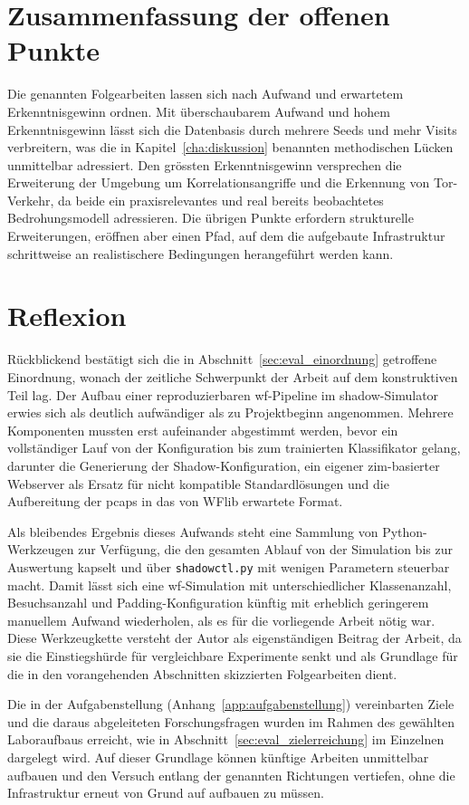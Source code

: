 \section{Zusammenfassung der offenen Punkte}
\label{sec:ausblick_summary}

Die genannten Folgearbeiten lassen sich nach Aufwand und erwartetem Erkenntnisgewinn ordnen.
Mit überschaubarem Aufwand und hohem Erkenntnisgewinn lässt sich die Datenbasis durch mehrere Seeds und mehr Visits verbreitern, was die in Kapitel~\ref{cha:diskussion} benannten methodischen Lücken unmittelbar adressiert.
Den grössten Erkenntnisgewinn versprechen die Erweiterung der Umgebung um Korrelationsangriffe und die Erkennung von Tor-Verkehr, da beide ein praxisrelevantes und real bereits beobachtetes Bedrohungsmodell adressieren.
Die übrigen Punkte erfordern strukturelle Erweiterungen, eröffnen aber einen Pfad, auf dem die aufgebaute Infrastruktur schrittweise an realistischere Bedingungen herangeführt werden kann.

\section{Reflexion}
\label{sec:ausblick_reflexion}

Rückblickend bestätigt sich die in Abschnitt~\ref{sec:eval_einordnung} getroffene Einordnung, wonach der zeitliche Schwerpunkt der Arbeit auf dem konstruktiven Teil lag.
Der Aufbau einer reproduzierbaren \gls{wf}-Pipeline im \gls{shadow}-Simulator erwies sich als deutlich aufwändiger als zu Projektbeginn angenommen.
Mehrere Komponenten mussten erst aufeinander abgestimmt werden, bevor ein vollständiger Lauf von der Konfiguration bis zum trainierten Klassifikator gelang, darunter die Generierung der Shadow-Konfiguration, ein eigener \gls{zim}-basierter Webserver als Ersatz für nicht kompatible Standardlösungen und die Aufbereitung der \glspl{pcap} in das von WFlib erwartete Format.

Als bleibendes Ergebnis dieses Aufwands steht eine Sammlung von Python-Werkzeugen zur Verfügung, die den gesamten Ablauf von der Simulation bis zur Auswertung kapselt und über \texttt{shadowctl.py} mit wenigen Parametern steuerbar macht.
Damit lässt sich eine \gls{wf}-Simulation mit unterschiedlicher Klassenanzahl, Besuchsanzahl und Padding-Konfiguration künftig mit erheblich geringerem manuellem Aufwand wiederholen, als es für die vorliegende Arbeit nötig war.
Diese Werkzeugkette versteht der Autor als eigenständigen Beitrag der Arbeit, da sie die Einstiegshürde für vergleichbare Experimente senkt und als Grundlage für die in den vorangehenden Abschnitten skizzierten Folgearbeiten dient.

Die in der Aufgabenstellung (Anhang~\ref{app:aufgabenstellung}) vereinbarten Ziele und die daraus abgeleiteten Forschungsfragen wurden im Rahmen des gewählten Laboraufbaus erreicht, wie in Abschnitt~\ref{sec:eval_zielerreichung} im Einzelnen dargelegt wird.
Auf dieser Grundlage können künftige Arbeiten unmittelbar aufbauen und den Versuch entlang der genannten Richtungen vertiefen, ohne die Infrastruktur erneut von Grund auf aufbauen zu müssen.
